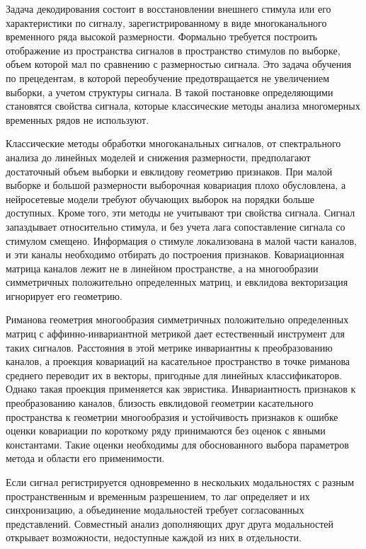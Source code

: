 {\actuality} Задача декодирования состоит в восстановлении внешнего стимула или его характеристики по сигналу, зарегистрированному в виде многоканального временного ряда высокой размерности. Формально требуется построить отображение из пространства сигналов в пространство стимулов по выборке, объем которой мал по сравнению с размерностью сигнала. Это задача обучения по прецедентам, в которой переобучение предотвращается не увеличением выборки, а учетом структуры сигнала. В такой постановке определяющими становятся свойства сигнала, которые классические методы анализа многомерных временных рядов не используют.

Классические методы обработки многоканальных сигналов, от спектрального анализа до линейных моделей и снижения размерности, предполагают достаточный объем выборки и евклидову геометрию признаков. При малой выборке и большой размерности выборочная ковариация плохо обусловлена, а нейросетевые модели требуют обучающих выборок на порядки больше доступных. Кроме того, эти методы не учитывают три свойства сигнала. Сигнал запаздывает относительно стимула, и без учета лага сопоставление сигнала со стимулом смещено. Информация о стимуле локализована в малой части каналов, и эти каналы необходимо отбирать до построения признаков. Ковариационная матрица каналов лежит не в линейном пространстве, а на многообразии симметричных положительно определенных матриц, и евклидова векторизация игнорирует его геометрию.

Риманова геометрия многообразия симметричных положительно определенных матриц с аффинно-инвариантной метрикой дает естественный инструмент для таких сигналов. Расстояния в этой метрике инвариантны к преобразованию каналов, а проекция ковариаций на касательное пространство в точке риманова среднего переводит их в векторы, пригодные для линейных классификаторов. Однако такая проекция применяется как эвристика. Инвариантность признаков к преобразованию каналов, близость евклидовой геометрии касательного пространства к геометрии многообразия и устойчивость признаков к ошибке оценки ковариации по короткому ряду принимаются без оценок с явными константами. Такие оценки необходимы для обоснованного выбора параметров метода и области его применимости.

Если сигнал регистрируется одновременно в нескольких модальностях с разным пространственным и временным разрешением, то лаг определяет и их синхронизацию, а объединение модальностей требует согласованных представлений. Совместный анализ дополняющих друг друга модальностей открывает возможности, недоступные каждой из них в отдельности.

